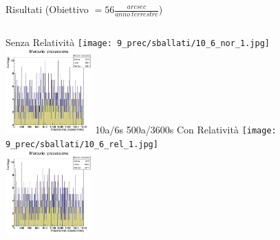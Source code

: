     \begin{frame}{Risultati (Obiettivo $= 56 \frac{arcsec}{anno\ terrestre}$)}
        \begin{columns}
                \centering
                Senza Relatività
                \texttt{[image: 9\_prec/sballati/10\_6\_nor\_1.jpg]}\\
                \includegraphics[width=\textwidth, height=3.25cm]{9_prec/sballati/500_3600_nor_1.jpg}
                \centering
                10a/6s
                \vspace{3cm}
                500a/3600s
                \centering
                Con Relatività
                \texttt{[image: 9\_prec/sballati/10\_6\_rel\_1.jpg]}\\
                \includegraphics[width=\textwidth, height=3.25cm]{9_prec/sballati/500_3600_rel_1.jpg}
        \end{columns}
    \end{frame}

